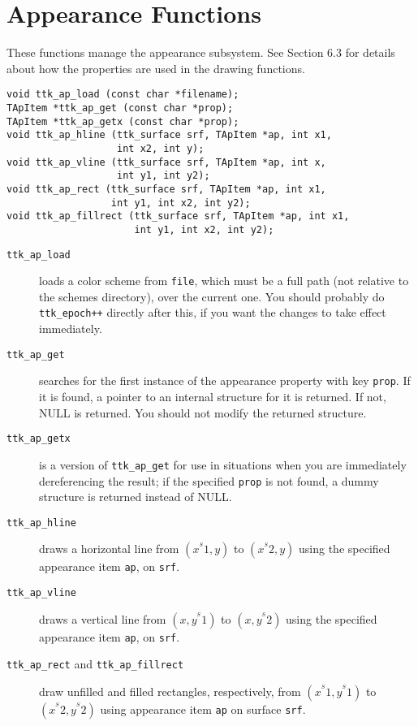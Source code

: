 \documentclass[12pt,letterpaper]{report}
\let\ttt\tt
\def\tt{\def\_{{\ttt\char`\_}}\ttt}
\begin{document}
\section{Appearance Functions}
These functions manage the appearance subsystem. See Section 6.3 for details about how the properties
are used in the drawing functions.

\begin{verbatim}
void ttk_ap_load (const char *filename);
TApItem *ttk_ap_get (const char *prop);
TApItem *ttk_ap_getx (const char *prop);
void ttk_ap_hline (ttk_surface srf, TApItem *ap, int x1,
                   int x2, int y);
void ttk_ap_vline (ttk_surface srf, TApItem *ap, int x,
                   int y1, int y2);
void ttk_ap_rect (ttk_surface srf, TApItem *ap, int x1,
                  int y1, int x2, int y2);
void ttk_ap_fillrect (ttk_surface srf, TApItem *ap, int x1,
                      int y1, int x2, int y2);
\end{verbatim}
\vskip6pt
\begin{description}
\item[{\tt ttk_ap_load}] loads a color scheme from \verb|file|, which must be a full path (not
relative to the schemes directory), over the current one. You should probably do
\verb|ttk_epoch++| directly after this, if you want the changes to take effect immediately.
\item[{\tt ttk_ap_get}] searches for the first instance of the appearance property with key \verb|prop|.
If it is found, a pointer to an internal structure for it is returned. If not, NULL is returned. You should
not modify the returned structure.
\item[{\tt ttk_ap_getx}] is a version of \verb|ttk_ap_get| for use in situations when you are immediately
dereferencing the result; if the specified \verb|prop| is not found, a dummy structure is returned instead
of NULL.
\item[{\tt ttk_ap_hline}] draws a horizontal line from $(x^^S1,y)$ to $(x^^S2,y)$ using the specified
appearance item \verb|ap|, on \verb|srf|.
\item[{\tt ttk_ap_vline}] draws a vertical line from $(x,y^^S1)$ to $(x,y^^S2)$ using the specified
appearance item \verb|ap|, on \verb|srf|.
\item[{\tt ttk_ap_rect} and {\tt ttk_ap_fillrect}] draw unfilled and filled rectangles, respectively,
from $(x^^S1,y^^S1)$ to $(x^^S2,y^^S2)$ using appearance item \verb|ap| on surface \verb|srf|.
\end{description}
\end{document}
